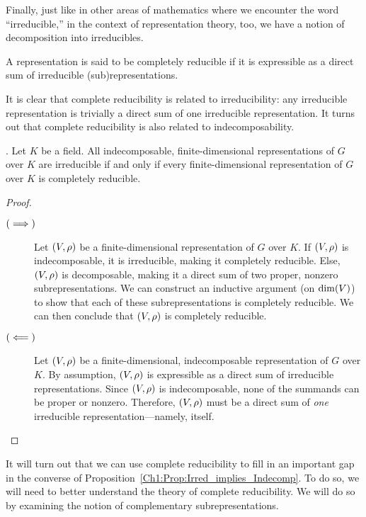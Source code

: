 Finally, just like in other areas of mathematics where we encounter the word ``irreducible,'' in the context of representation theory, too, we have a notion of decomposition into irreducibles.

\begin{boxdefinition}\label{Ch1:Def:Comp_Red}
    A representation is said to be completely reducible if it is expressible as a direct sum of irreducible (sub)representations.
\end{boxdefinition}
It is clear that complete reducibility is related to irreducibility: any irreducible representation is trivially a direct sum of one irreducible representation. It turns out that complete reducibility is also related to indecomposability.

\begin{proposition}\label{Ch1:Prop:Indecomp_implies_Irred_iff_Comp_Red}
    . Let $K$ be a field. All indecomposable, finite-dimensional representations of $G$ over $K$ are irreducible if and only if every finite-dimensional representation of $G$ over $K$ is completely reducible.
\end{proposition}
\begin{proof}
    \hfill
    \begin{description}
        \item[$\left( \implies \right)$] Let $\left( V, \rho \right)$ be a finite-dimensional representation of $G$ over $K$. If $\left( V, \rho \right)$ is indecomposable, it is irreducible, making it completely reducible. Else, $\left( V, \rho \right)$ is decomposable, making it a direct sum of two proper, nonzero subrepresentations. We can construct an inductive argument (on $\dim\!\left( V \right)$) to show that each of these subrepresentations is completely reducible. We can then conclude that $\left( V, \rho \right)$ is completely reducible.

        \item[$\left( \impliedby \right)$] Let $\left( V, \rho \right)$ be a finite-dimensional, indecomposable representation of $G$ over $K$. By assumption, $\left( V, \rho \right)$ is expressible as a direct sum of irreducible representations. Since $\left( V, \rho \right)$ is indecomposable, none of the summands can be proper or nonzero. Therefore, $\left( V, \rho \right)$ must be a direct sum of \textit{one} irreducible representation---namely, itself.
    \end{description}
\end{proof}
It will turn out that we can use complete reducibility to fill in an important gap in the converse of Proposition~\ref{Ch1:Prop:Irred_implies_Indecomp}. To do so, we will need to better understand the theory of complete reducibility. We will do so by examining the notion of complementary subrepresentations.

